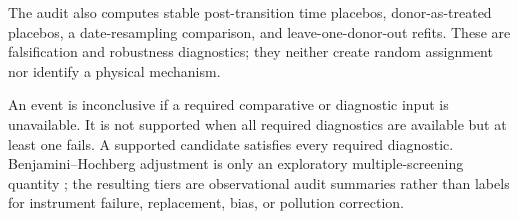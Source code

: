 The audit also computes stable post-transition time placebos,
donor-as-treated placebos, a date-resampling comparison, and
leave-one-donor-out refits. These are falsification and robustness diagnostics;
they neither create random assignment nor identify a physical mechanism.



An event is inconclusive if a required comparative or diagnostic input is
unavailable. It is not supported when all required diagnostics are available
but at least one fails. A supported candidate satisfies every required
diagnostic. Benjamini--Hochberg adjustment is only an exploratory
multiple-screening quantity \citep{benjamini1995}; the resulting tiers are
observational audit summaries rather than labels for instrument failure,
replacement, bias, or pollution correction.
